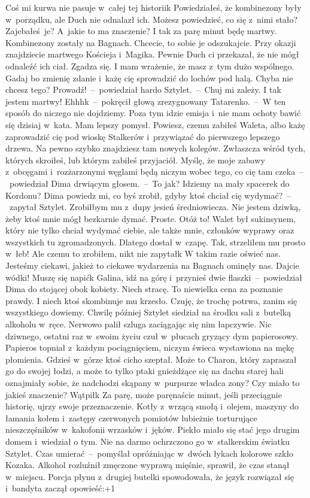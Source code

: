 \documentclass[../MAIN.tex]{subfiles}
\begin{document}
\sx Coś mi kurwa nie pasuje w~całej tej historii\3k Powiedziałeś, że kombinezony były w~porządku, ale Duch nie odnalazł ich. Możesz powiedzieć, co się z~nimi stało? Zajebałeś~je?
\xx A~jakie to ma znaczenie? I tak za parę minut będę martwy. Kombinezony zostały na Bagnach. Chcecie, to sobie je odszukajcie. Przy okazji znajdziecie martwego Kościeja i~Magika. Pewnie Duch ci przekazał, że nie mógł odnaleźć ich ciał.
\xx Zgadza się. I mam wrażenie, że masz z~tym dużo wspólnego. Gadaj bo zmienię zdanie i~każę cię sprowadzić do lochów pod halą. Chyba nie chcesz tego?
\xx Prowadź!~--~powiedział hardo Sztylet.~--~Chuj mi zależy. I tak jestem martwy!
\xx Ehhh\3k~--~pokręcił głową zrezygnowany Tatarenko.~--~W ten sposób do niczego nie dojdziemy. Poza tym idzie emisja i~nie mam ochoty bawić się dzisiaj w~kata. Mam lepszy pomysł. Powiesz, czemu zabiłeś Waleta, albo każę zaprowadzić cię pod wioskę Stalkerów i~przywiązać do pierwszego lepszego drzewa. Na pewno szybko znajdziesz tam nowych kolegów. Zwłaszcza wśród tych, których skroiłeś, lub którym zabiłeś przyjaciół. Myślę, że moje zabawy z~obcęgami i~rozżarzonymi węglami będą niczym wobec tego, co cię tam czeka~--~powiedział Dima drwiącym głosem.~--~To jak? Idziemy na mały spacerek do Kordonu?
\xx Dima powiedz mi, co byś zrobił, gdyby ktoś chciał cię wydymać?~--~zapytał Sztylet.
\xx Zrobiłbym mu z~dupy jesień średniowiecza. Nie jestem dziwką, żeby ktoś mnie mógł bezkarnie dymać. Proste.
\xx Otóż to! Walet był sukinsynem, który nie tylko chciał wydymać ciebie, ale także mnie, członków wyprawy oraz wszystkich tu zgromadzonych. Dlatego dostał w~czapę. Tak, strzeliłem mu prosto w~łeb! Ale czemu to zrobiłem, nikt nie zapytał\3k
\xx W takim razie oświeć nas. Jesteśmy ciekawi, jakież to ciekawe wydarzenia na Bagnach ominęły nas.
\xx Dajcie wódki! Muszę się napić\3k
\xx Galina, idź na górę i~przynieś dwie flaszki~--~powiedział Dima do stojącej obok kobiety.
\xx Niech stracę. To niewielka cena za poznanie prawdy. I niech ktoś skombinuje mu krzesło. Czuję, że trochę potrwa, zanim się wszystkiego dowiemy.
\qm
Chwilę później Sztylet siedział na środku sali z~butelką alkoholu w~ręce. Nerwowo palił szluga zaciągając się nim łapczywie. Nic dziwnego, ostatni raz w~swoim życiu czuł w~płucach gryzący dym papierosowy. Papieros topniał z~każdym pociągnięciem, niczym świeca wystawiona na mękę płomienia. Gdzieś w~górze ktoś cicho szeptał. Może to Charon, który zapraszał go do swojej łodzi, a może to tylko ptaki gnieżdżące się na dachu starej hali oznajmiały sobie, że nadchodzi skąpany w~purpurze władca zony? Czy miało to jakieś znaczenie? Wątpił\3k Za parę, może paręnaście minut, jeśli przeciągnie historię, ujrzy swoje przeznaczenie. Kotły z~wrzącą smołą i~olejem, maszyny do łamania kołem i~zastępy czerwonych pomiotów lubieżnie torturujące nieszczęśników w~kakofonii wrzasków i~jęków. Piekło miało się stać jego drugim domem i~wiedział o tym. Nie na darmo ochrzczono go w~stalkerskim światku Sztylet. Czas umierać~--~pomyślał opróżniając w~dwóch łykach kolorowe szkło Kozaka. Alkohol rozluźnił zmęczone wyprawą
mięśnie, sprawił,
że czas stanął w~miejscu. Porcja płynu z~drugiej butelki spowodowała, że język rozwiązał się i~bandyta zaczął opowieść:\looseness+1
\end{document}

